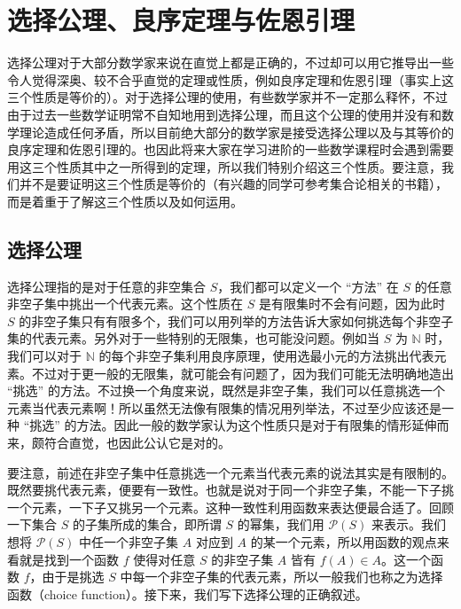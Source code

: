 
\chapter{选择公理、良序定理与佐恩引理}

选择公理对于大部分数学家来说在直觉上都是正确的，不过却可以用它推导出一些令人觉得深奥、较不合乎直觉的定理或性质，例如良序定理和佐恩引理（事实上这三个性质是等价的）。对于选择公理的使用，有些数学家并不一定那么释怀，不过由于过去一些数学证明常不自知地用到选择公理，而且这个公理的使用并没有和数学理论造成任何矛盾，所以目前绝大部分的数学家是接受选择公理以及与其等价的良序定理和佐恩引理的。也因此将来大家在学习进阶的一些数学课程时会遇到需要用这三个性质其中之一所得到的定理，所以我们特别介绍这三个性质。要注意，我们并不是要证明这三个性质是等价的（有兴趣的同学可参考集合论相关的书籍），而是着重于了解这三个性质以及如何运用。

\section{选择公理}

选择公理指的是对于任意的非空集合 $S$，我们都可以定义一个 “方法” 在 $S$ 的任意非空子集中挑出一个代表元素。这个性质在 $S$ 是有限集时不会有问题，因为此时 $S$ 的非空子集只有有限多个，我们可以用列举的方法告诉大家如何挑选每个非空子集的代表元素。另外对于一些特别的无限集，也可能没问题。例如当 $S$ 为 $\mathbb{N}$ 时，我们可以对于 $\mathbb{N}$ 的每个非空子集利用良序原理，使用选最小元的方法挑出代表元素。不过对于更一般的无限集，就可能会有问题了，因为我们可能无法明确地造出 “挑选” 的方法。不过换一个角度来说，既然是非空子集，我们可以任意挑选一个元素当代表元素啊！所以虽然无法像有限集的情况用列举法，不过至少应该还是一种 “挑选” 的方法。因此一般的数学家认为这个性质只是对于有限集的情形延伸而来，颇符合直觉，也因此公认它是对的。

要注意，前述在非空子集中任意挑选一个元素当代表元素的说法其实是有限制的。既然要挑代表元素，便要有一致性。也就是说对于同一个非空子集，不能一下子挑一个元素，一下子又挑另一个元素。这种一致性利用函数来表达便最合适了。回顾一下集合 $S$ 的子集所成的集合，即所谓 $S$ 的幂集，我们用 $\mathcal{P}(S)$ 来表示。我们想将 $\mathcal{P}(S)$ 中任一个非空子集 $A$ 对应到 $A$ 的某一个元素，所以用函数的观点来看就是找到一个函数 $f$ 使得对任意 $S$ 的非空子集 $A$ 皆有 $f(A) \in A$。这一个函数 $f$，由于是挑选 $S$ 中每一个非空子集的代表元素，所以一般我们也称之为选择函数（choice function）。接下来，我们写下选择公理的正确叙述。

